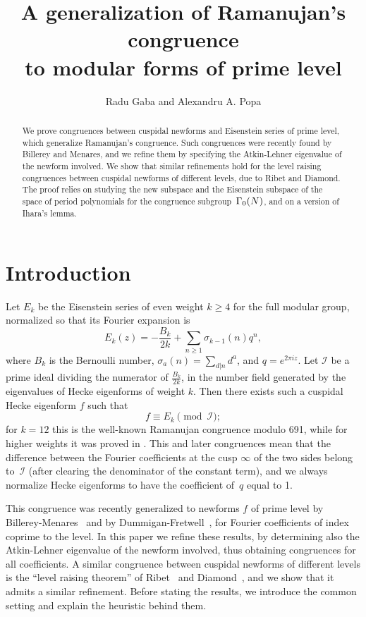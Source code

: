 \documentclass{amsart}
\title[A generalization of Ramanujan's congruence]
{A generalization of Ramanujan's congruence\\ to modular forms of prime level}
\author{Radu Gaba and Alexandru A. Popa}
\theoremstyle{plain}
\theoremstyle{definition}
\numberwithin{equation}{section}
\def\I{\mathcal{I}} \def\J{\mathcal{J}} \def\LL{\mathcal{L}}
\def\be{\begin{equation}}  \def\ee{\end{equation}}
\begin{document}
\begin{abstract} We prove congruences between cuspidal newforms and
Eisenstein series of prime level, which generalize Ramanujan's congruence. 
Such congruences were recently found by Billerey and Menares, 
and we refine them by specifying the Atkin-Lehner eigenvalue of the newform 
involved. We show that similar refinements hold for the level raising congruences 
between cuspidal newforms of different levels, due to Ribet and Diamond. 
The proof relies on studying the new subspace and the Eisenstein subspace 
of the space of period polynomials for the congruence subgroup~$\Gamma_0(N)$, 
and on a version of Ihara's lemma. 
\end{abstract}
\maketitle


\section{Introduction}


Let $E_k$ be the Eisenstein series of even weight $k\ge 4$ for the full
modular group, normalized so that its Fourier expansion is
 \[ E_k(z)=-\frac{B_k}{2k}+\sum_{n\ge 1} \sigma_{k-1}(n) q^n, \]
where  $B_k$ is the Bernoulli number, $\sigma_{a}(n)=\sum_{d|n} d^a$, 
and $q=e^{2\pi i z}$. Let $\I$ be a prime ideal dividing 
the numerator of $\frac{B_k}{2k}$, in the number field generated by 
the eigenvalues of Hecke eigenforms of weight $k$.  
Then there exists such a cuspidal Hecke eigenform $f$ such that 
 \be \label{e0} f\equiv E_k \pmod{\I};\ee
for $k=12$ this is the well-known Ramanujan congruence modulo 691, 
while for higher weights it was proved in \cite{H,DG}. This and later 
congruences mean that the difference between the 
Fourier coefficients at the cusp $\infty$ of the two sides belong to~$\I$
(after clearing the denominator of the constant term), and we always normalize
Hecke eigenforms to have the coefficient of~$q$ equal to 1. 

This congruence was recently generalized to newforms $f$ of prime level by 
Billerey-Menares~\cite{BM} and by Dummigan-Fretwell~\cite{DF}, for 
Fourier coefficients of index coprime to the level. In this paper 
we refine these results, by determining also the Atkin-Lehner eigenvalue 
of the newform involved, thus obtaining congruences for all coefficients.
A similar congruence between cuspidal newforms of different levels is the 
``level raising theorem'' of Ribet~\cite{Ri} and Diamond~\cite{Di}, and 
we show that it admits a similar refinement. Before stating the results, 
we introduce the common setting and explain the heuristic behind them. 
\end{document}
